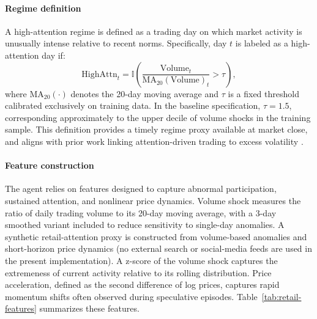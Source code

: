 \documentclass[review]{elsarticle}
\begin{document}
\paragraph{Regime definition}
A high-attention regime is defined as a trading day on which market activity is unusually intense relative to recent norms. Specifically, day $t$ is labeled as a high-attention day if:
\begin{equation}\label{eq:retail-regime}
\text{HighAttn}_{t} =
\mathbb{I}\!\left(
\frac{\text{Volume}_{t}}{\text{MA}_{20}(\text{Volume})_{t}} > \tau
\right),
\end{equation}
where $\text{MA}_{20}(\cdot)$ denotes the 20-day moving average and $\tau$ is a fixed threshold calibrated exclusively on training data. In the baseline specification, $\tau = 1.5$, corresponding approximately to the upper decile of volume shocks in the training sample. This definition provides a timely regime proxy available at market close, and aligns with prior work linking attention-driven trading to excess volatility \cite{barber2008,da2011}.

\paragraph{Feature construction}
The agent relies on features designed to capture abnormal participation, sustained attention, and nonlinear price dynamics. Volume shock measures the ratio of daily trading volume to its 20-day moving average, with a 3-day smoothed variant included to reduce sensitivity to single-day anomalies. A synthetic retail-attention proxy is constructed from volume-based anomalies and short-horizon price dynamics (no external search or social-media feeds are used in the present implementation). %
A z-score of the volume shock captures the extremeness of current activity relative to its rolling distribution. Price acceleration, defined as the second difference of log prices, captures rapid momentum shifts often observed during speculative episodes. Table~\ref{tab:retail-features} summarizes these features.
\end{document}
